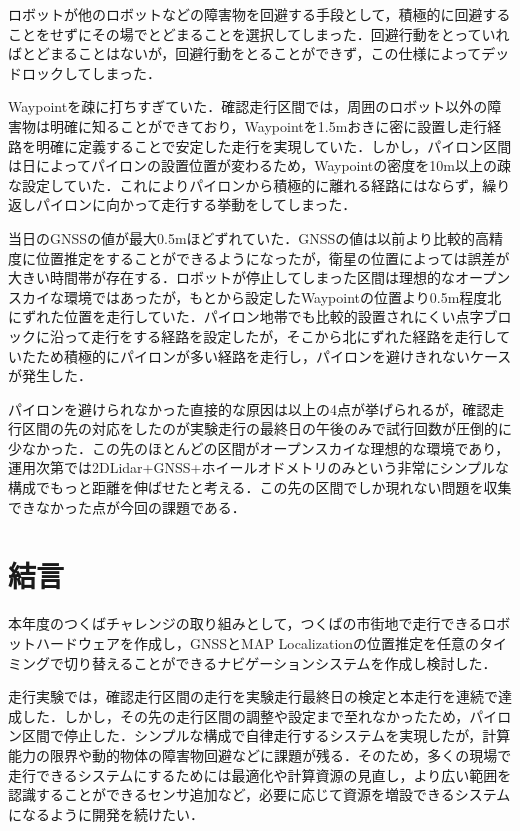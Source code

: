 \documentclass[platex,dvipdfmx]{rbproceedings}
\begin{document}
ロボットが他のロボットなどの障害物を回避する手段として，積極的に回避することをせずにその場でとどまることを選択してしまった．回避行動をとっていればとどまることはないが，回避行動をとることができず，この仕様によってデッドロックしてしまった．

Waypointを疎に打ちすぎていた．確認走行区間では，周囲のロボット以外の障害物は明確に知ることができており，Waypointを1.5mおきに密に設置し走行経路を明確に定義することで安定した走行を実現していた．しかし，パイロン区間は日によってパイロンの設置位置が変わるため，Waypointの密度を10m以上の疎な設定していた．これによりパイロンから積極的に離れる経路にはならず，繰り返しパイロンに向かって走行する挙動をしてしまった．

当日のGNSSの値が最大0.5mほどずれていた．GNSSの値は以前より比較的高精度に位置推定をすることができるようになったが，衛星の位置によっては誤差が大きい時間帯が存在する．ロボットが停止してしまった区間は理想的なオープンスカイな環境ではあったが，もとから設定したWaypointの位置より0.5m程度北にずれた位置を走行していた．パイロン地帯でも比較的設置されにくい点字ブロックに沿って走行をする経路を設定したが，そこから北にずれた経路を走行していたため積極的にパイロンが多い経路を走行し，パイロンを避けきれないケースが発生した．

パイロンを避けられなかった直接的な原因は以上の4点が挙げられるが，確認走行区間の先の対応をしたのが実験走行の最終日の午後のみで試行回数が圧倒的に少なかった．この先のほとんどの区間がオープンスカイな理想的な環境であり，運用次第では2DLidar+GNSS+ホイールオドメトリのみという非常にシンプルな構成でもっと距離を伸ばせたと考える．この先の区間でしか現れない問題を収集できなかった点が今回の課題である．

\section{結言}
本年度のつくばチャレンジの取り組みとして，つくばの市街地で走行できるロボットハードウェアを作成し，GNSSとMAP Localizationの位置推定を任意のタイミングで切り替えることができるナビゲーションシステムを作成し検討した．

走行実験では，確認走行区間の走行を実験走行最終日の検定と本走行を連続で達成した．しかし，その先の走行区間の調整や設定まで至れなかったため，パイロン区間で停止した．シンプルな構成で自律走行するシステムを実現したが，計算能力の限界や動的物体の障害物回避などに課題が残る．そのため，多くの現場で走行できるシステムにするためには最適化や計算資源の見直し，より広い範囲を認識することができるセンサ追加など，必要に応じて資源を増設できるシステムになるように開発を続けたい．
\end{document}
